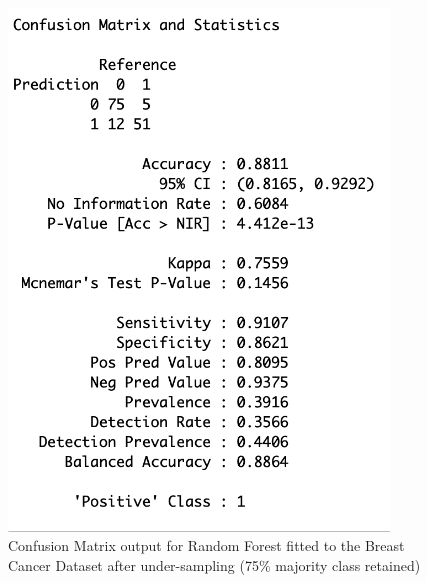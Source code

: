\begin{figure}[!htbp]
\begin{minipage}{0.45\textwidth}
        \includegraphics[width=0.9\textwidth]{ThesisTemplate/appendix/images/Chapter5Appendix/ConfusionMatrix75/BreastCancer.png}
        \caption{Confusion Matrix output for Random Forest fitted to the Breast Cancer Dataset after under-sampling (75\% majority class retained)}
        \label{fig:my_label}
    \end{minipage}
\end{figure}

